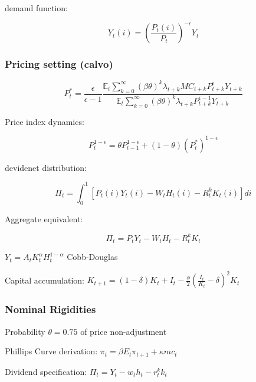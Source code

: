 \documentclass[11pt,preprint]{elsarticle}
\numberwithin{equation}{section}
\numberwithin{figure}{section}
\numberwithin{table}{section}
\begin{document}
demand function:

\begin{equation}
Y_t(i) = \left( \frac{P_t(i)}{P_t} \right)^{-\epsilon} Y_t
\label{demand_curve}
\end{equation}

\subsubsection{Pricing setting (calvo)}\label{pricing-setting-calvo}

\begin{equation}
P_t^* = \frac{\epsilon}{\epsilon-1} \frac{
\mathbb{E}_t \sum_{k=0}^{\infty} (\beta\theta)^k \lambda_{t+k} MC_{t+k} P_{t+k}^{\epsilon} Y_{t+k}
}{
\mathbb{E}_t \sum_{k=0}^{\infty} (\beta\theta)^k \lambda_{t+k} P_{t+k}^{\epsilon-1} Y_{t+k}
}
\label{optimal_price}
\end{equation}

Price index dynamics:

\begin{equation}
P_t^{1-\epsilon} = \theta P_{t-1}^{1-\epsilon} + (1-\theta)(P_t^*)^{1-\epsilon}
\label{price_index}
\end{equation}

devidenet distribution:

\begin{equation}
\Pi_t = \int_0^1 \left[ P_t(i)Y_t(i) - W_t H_t(i) - R_t^k K_t(i) \right] di
\label{dividends}
\end{equation}

Aggregate equivalent:

\begin{equation}
\Pi_t = P_t Y_t - W_t H_t - R_t^k K_t
\label{agg_dividends}
\end{equation}

\(Y_t = A_t K_t^\alpha H_t^{1-\alpha}\) Cobb-Douglas

Capital accumulation:
\(K_{t+1} = (1-\delta)K_t + I_t - \frac{\phi}{2}\left(\frac{I_t}{K_t} - \delta\right)^2 K_t\)

\subsubsection{Nominal Rigidities}\label{nominal-rigidities}

Probability \(\theta=0.75\) of price non-adjustment

Phillips Curve derivation: \(\pi_t = \beta E_t\pi_{t+1} + \kappa mc_t\)

Dividend specification: \(\Pi_t = Y_t - w_t h_t - r_t^k k_t\)
\end{document}
